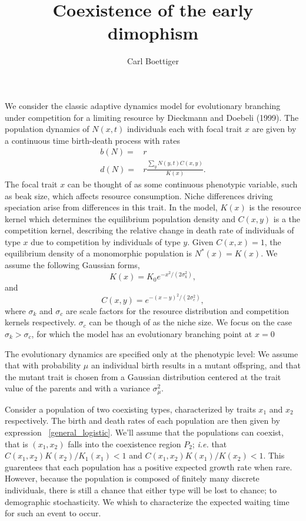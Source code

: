 \documentclass[letterpaper,10pt]{article}
\title{Coexistence of the early dimophism}
\author{Carl Boettiger}
\begin{document}
\maketitle
We consider the classic adaptive dynamics model for evolutionary branching under competition for a limiting resource by Dieckmann and Doebeli (1999).  The population dynamics of $N(x,t)$ individuals each with focal trait $x$ are given by a continuous time birth-death process with rates 
\begin{align}
b(N) = & r \nonumber \\
d(N) = & r \frac{\sum_yN(y,t)C(x,y)}{K(x)} .\label{general_logistic}
\end{align}
The focal trait $x$ can be thought of as some continuous phenotypic variable, such as beak size, which affects resource consumption.  Niche differences driving speciation arise from differences in this trait.  In the model, $K(x)$ is the resource kernel which determines the equilibrium population density and $C(x,y)$ is a the competition kernel, describing the relative change in death rate of individuals of type $x$ due to competition by individuals of type $y$.  Given $C(x,x)=1$, the equilibrium density of a monomorphic population is $N^{\ast}(x)=K(x)$.  We assume the following Gaussian forms,
\begin{equation}
K(x)=K_0e^{-x^2/(2\sigma_k^2)}, \label{K}
\end{equation}
and
\begin{equation}
C(x,y)=e^{-(x-y)^2/(2\sigma_c^2)}, \label{C}
\end{equation}
where $\sigma_k$ and $\sigma_c$ are scale factors for the resource distribution and competition kernels respectively.  $\sigma_c$ can be though of as the niche size.  We focus on the case $\sigma_k>\sigma_c$, for which the model has an evolutionary branching point at $x=0$

The evolutionary dynamics are specified only at the phenotypic level: We assume that with probability $\mu$ an individual birth results in a mutant offspring, and that the mutant trait is chosen from a Gaussian distribution centered at the trait value of the parents and with a variance $\sigma_{\mu}^2$. 


Consider a population of two coexisting types, characterized by traits $x_1$ and $x_2$ respectively.  The birth and death rates of each population are then given by expression ~\eqref{general_logistic}.  We'll assume that the populations can coexist, that is $(x_1, x_2)$ falls into the coexistence region $P_2$; \emph{i.e.} that $C(x_1,x_2)K(x_2) /K_1(x_1) < 1 $ and $C(x_1, x_2) K(x_1)/K(x_2) < 1$.  This guarentees that each population has a positive expected growth rate when rare.  However, because the population is composed of finitely many discrete individuals, there is still a chance that either type will be lost to chance; to demographic stochasticity.  We whish to characterize the expected waiting time for such an event to occur. 
\end{document}
